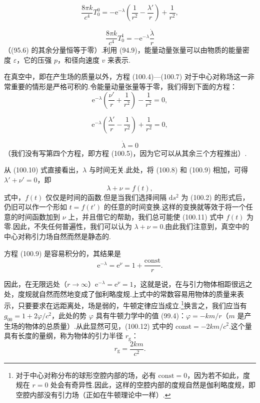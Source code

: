 \begin{equation}
  \frac{8\pi k}{c^{4}}T_0^0
  =-\mathrm{e}^{-\lambda}\left(\frac{1}{r^{2}}-\frac{\lambda'}{r}\right)
  +\frac{1}{r^{2}},
\end{equation}

\begin{equation}
  \frac{8\pi k}{c^{4}}T_0^1=-\mathrm{e}^{-\lambda}\frac{\dot{\lambda}}{r}
\end{equation}
（(95.6) 的其余分量恒等于零）.利用 (94.9)，能量动量张量可以由物质的能量密度 $\varepsilon$，它的压强 $p$，和径向速度 $v$ 来表示.

在真空中，即在产生场的质量以外，方程 (100.4)—(100.7) 对于中心对称场这一非常重要的情形是严格可积的.令能量动量张量等于零，我们得到下面的方程：
\begin{equation}
  \mathrm{e}^{-\lambda}\left(\frac{\nu'}{r}+\frac{1}{r^{2}}\right)
  -\frac{1}{r^{2}}=0,
\end{equation}

\begin{equation}
  \mathrm{e}^{-\lambda}\left(\frac{\lambda'}{r}-\frac{1}{r^{2}}\right)
  +\frac{1}{r^{2}}=0,
\end{equation}

\begin{equation}
  \dot{\lambda}=0
\end{equation}
（我们没有写第四个方程，即方程 (100.5)，因为它可以从其余三个方程推出）.

从 (100.10) 式直接看出，$\lambda$ 与时间无关.此处，将 (100.8) 和 (100.9) 相加，可得 $\lambda'+\nu'=0$，即
\begin{equation}
  \lambda+\nu=f(t),
\end{equation}
式中，$f(t)$ 仅仅是时间的函数.但是当我们选择间隔 $\mathrm{d}s^{2}$ 为 (100.2) 的形式后，仍旧可以作一个形如 $t=f(t')$ 的任意的时间变换.这样的变换就等效于将一个任意的时间函数加到 $\nu$ 上，并且借它的帮助，我们总可能使 (100.11) 式中 $f(t)$ 为零.因此，不失任何普遍性，我们可以认为 $\lambda+\nu=0$.由此我们注意到，真空中的中心对称引力场自然而然是静态的.

方程 (100.9) 是容易积分的，其结果是
\begin{equation}
  \mathrm{e}^{-\lambda}=\mathrm{e}^{\nu}
  =1+\frac{\mathrm{const}}{r}.
\end{equation}

因此，在无限远处（$r\to\infty$）$\mathrm{e}^{-\lambda}=\mathrm{e}^{\nu}=1$，这就是说，在与引力物体相距很远之处，度规就自然而然地变成了伽利略度规.上式中的常数容易用物体的质量来表示，只要要求在远距离处，场是弱的，牛顿定律应当成立.\footnote{对于中心对称分布的球形空腔内部的场，必有 $\mathrm{const}=0$，因为若不如此，度规在 $r=0$ 处会有奇异性.因此，这样的空腔内部的度规自然是伽利略度规，即空腔内部没有引力场（正如在牛顿理论中一样）.}换言之，我们应当有 $g_{00}=1+2\varphi/c^{2}$，此处的势 $\varphi$ 具有牛顿力学中的值 (99.4)：$\varphi=-km/r$（$m$ 是产生场的物体的总质量）.从此显然可见，(100.12) 式中的 $\mathrm{const}=-2km/c^{2}$.这个量具有长度的量纲，称为物体的引力半径 $r_{\mathrm{g}}$：
\begin{equation}
  r_{\mathrm{g}}=\frac{2km}{c^{2}}.
\end{equation}

